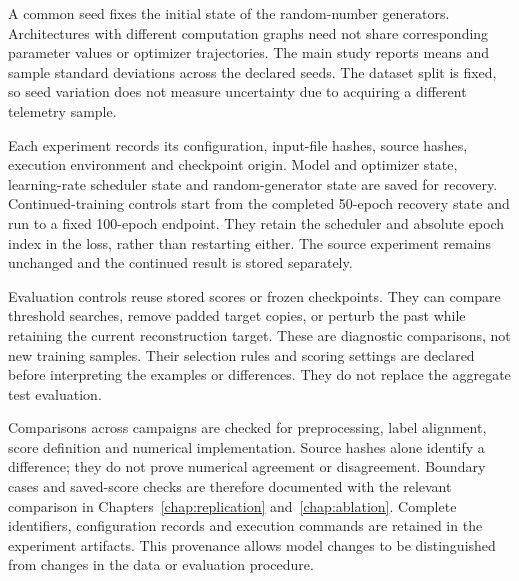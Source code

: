 A common seed fixes the initial state of the random-number generators.
Architectures with different computation graphs need not share corresponding
parameter values or optimizer trajectories. The main study reports means
and sample standard deviations across the declared seeds. The dataset split
is fixed, so seed variation does not measure uncertainty due to acquiring
a different telemetry sample.

Each experiment records its configuration, input-file hashes, source hashes,
execution environment and checkpoint origin. Model and optimizer state,
learning-rate scheduler state and random-generator state are saved for
recovery. Continued-training controls start from the completed
\num{50}-epoch recovery state and run to a fixed \num{100}-epoch endpoint.
They retain the scheduler and absolute epoch index in the loss, rather
than restarting either. The source experiment remains unchanged and the
continued result is stored separately.

Evaluation controls reuse stored scores or frozen checkpoints. They can
compare threshold searches, remove padded target copies, or perturb the
past while retaining the current reconstruction target. These are diagnostic
comparisons, not new training samples. Their selection rules and scoring
settings are declared before interpreting the examples or differences.
They do not replace the aggregate test evaluation.

Comparisons across campaigns are checked for preprocessing, label alignment,
score definition and numerical implementation. Source hashes alone identify
a difference; they do not prove numerical agreement or disagreement. Boundary
cases and saved-score checks are therefore documented with the relevant
comparison in Chapters~\ref{chap:replication} and~\ref{chap:ablation}.
Complete identifiers, configuration records and execution commands are retained
in the experiment artifacts. This provenance allows model changes
to be distinguished from changes in the data or evaluation procedure.
